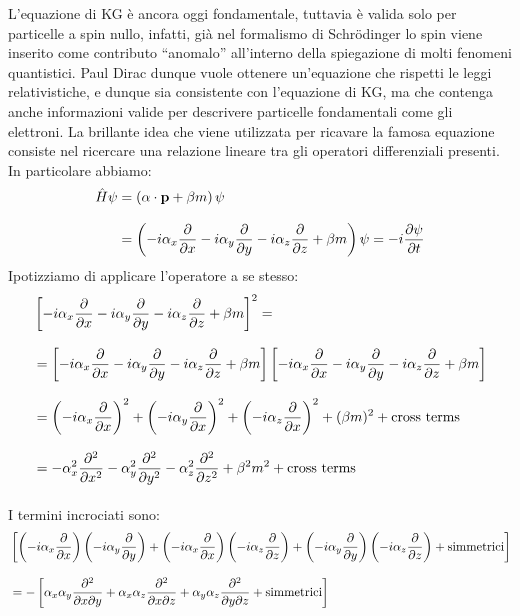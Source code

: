L'equazione di KG è ancora oggi fondamentale, tuttavia è valida solo per particelle a spin nullo, infatti, già nel formalismo di Schrödinger lo spin viene inserito come contributo ``anomalo'' all'interno della spiegazione di molti fenomeni quantistici.
Paul Dirac dunque vuole ottenere un'equazione che rispetti le leggi relativistiche, e dunque sia consistente con l'equazione di KG, ma che contenga anche informazioni valide per descrivere particelle fondamentali come gli elettroni.
La brillante idea che viene utilizzata per ricavare la famosa equazione consiste nel ricercare una relazione lineare tra gli operatori differenziali presenti. In particolare abbiamo:
\begin{equation}
    \begin{split}
        \hat{H}\psi &= \brackets{\vec{\alpha} \cdot \vec{p} + \beta m}\psi \\[8pt]
        &= \brackets{-i\alpha_x\pdv{}{x} -i\alpha_y\pdv{}{y} -i\alpha_z\pdv{}{z} + \beta m}\psi = -i\pdv{\psi}{t}
    \end{split}
\end{equation}
Ipotizziamo di applicare l'operatore a se stesso:
\begin{equation}
    \begin{split}
        &\left[ -i\alpha_x\pdv{}{x} -i\alpha_y\pdv{}{y} -i\alpha_z\pdv{}{z} + \beta m \right]^2  = \\[8pt]
        &= \left[ -i\alpha_x\pdv{}{x} -i\alpha_y\pdv{}{y} -i\alpha_z\pdv{}{z} + \beta m \right]
            \left[ -i\alpha_x\pdv{}{x} -i\alpha_y\pdv{}{y} -i\alpha_z\pdv{}{z} + \beta m \right]  \\[8pt]
        &=
                \brackets{-i\alpha_x\pdv{}{x}}^2 + \brackets{-i\alpha_y\pdv{}{x}}^2 + \brackets{-i\alpha_z\pdv{}{x}}^2
                + (\beta m)^2
                + \text{cross terms}
        \\[8pt]
        &=
                -\alpha_x^2 \pdv[2]{}{x}
                -\alpha_y^2 \pdv[2]{}{y}
                -\alpha_z^2 \pdv[2]{}{z}
                + \beta^2 m^2
                + \text{cross terms}
        \\[8pt]
    \end{split}
\end{equation}
I termini incrociati sono:
\begin{equation}
    \begin{split}
        &\left[
                \brackets{-i\alpha_x\pdv{}{x}} \brackets{-i\alpha_y\pdv{}{y}}
                + \brackets{-i\alpha_x\pdv{}{x}} \brackets{-i\alpha_z\pdv{}{z}}
                + \brackets{-i\alpha_y\pdv{}{y}} \brackets{-i\alpha_z\pdv{}{z}}
                + \text{simmetrici}
        \right] \\[8pt]
        &= -\left[
                \alpha_x\alpha_y \pdv{}{x}{y}
                + \alpha_x\alpha_z \pdv{}{x}{z}
                + \alpha_y\alpha_z \pdv{}{y}{z}
                + \text{simmetrici}
        \right] \\[8pt]
    \end{split}
\end{equation}
